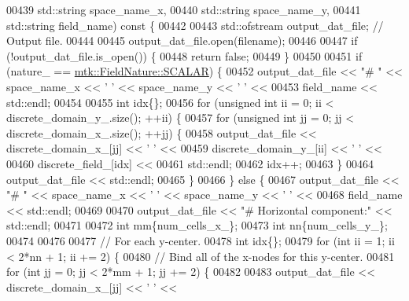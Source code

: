 \begin{DoxyCode}
00439                                     std::string space\_name\_x,
00440                                     std::string space\_name\_y,
00441                                     std::string field\_name)\textcolor{keyword}{ const }\{
00442 
00443   std::ofstream output\_dat\_file;  \textcolor{comment}{// Output file.}
00444 
00445   output\_dat\_file.open(filename);
00446 
00447   \textcolor{keywordflow}{if} (!output\_dat\_file.is\_open()) \{
00448     \textcolor{keywordflow}{return} \textcolor{keyword}{false};
00449   \}
00450 
00451   \textcolor{keywordflow}{if} (nature\_ == \hyperlink{namespacemtk_ga4c54f2a329cfb4e56213b02a259d19e2a8f3d9a4b6a7b7f2c7afa61ca113d0db9}{mtk::FieldNature::SCALAR}) \{
00452     output\_dat\_file << \textcolor{stringliteral}{"# "} << space\_name\_x <<  \textcolor{charliteral}{' '} << space\_name\_y << \textcolor{charliteral}{' '} <<
00453       field\_name << std::endl;
00454 
00455     \textcolor{keywordtype}{int} idx\{\};
00456     \textcolor{keywordflow}{for} (\textcolor{keywordtype}{unsigned} \textcolor{keywordtype}{int} ii = 0; ii < discrete\_domain\_y\_.size(); ++ii) \{
00457       \textcolor{keywordflow}{for} (\textcolor{keywordtype}{unsigned} \textcolor{keywordtype}{int} jj = 0; jj < discrete\_domain\_x\_.size(); ++jj) \{
00458         output\_dat\_file << discrete\_domain\_x\_[jj] << \textcolor{charliteral}{' '} <<
00459                            discrete\_domain\_y\_[ii] << \textcolor{charliteral}{' '} <<
00460                            discrete\_field\_[idx] <<
00461                           std::endl;
00462         idx++;
00463       \}
00464       output\_dat\_file << std::endl;
00465     \}
00466   \} \textcolor{keywordflow}{else} \{
00467     output\_dat\_file << \textcolor{stringliteral}{"# "} << space\_name\_x <<  \textcolor{charliteral}{' '} << space\_name\_y << \textcolor{charliteral}{' '} <<
00468       field\_name << std::endl;
00469 
00470     output\_dat\_file << \textcolor{stringliteral}{"# Horizontal component:"} << std::endl;
00471 
00472     \textcolor{keywordtype}{int} mm\{num\_cells\_x\_\};
00473     \textcolor{keywordtype}{int} nn\{num\_cells\_y\_\};
00474 
00476 
00477     \textcolor{comment}{// For each y-center.}
00478     \textcolor{keywordtype}{int} idx\{\};
00479     \textcolor{keywordflow}{for} (\textcolor{keywordtype}{int} ii = 1; ii < 2*nn + 1; ii += 2) \{
00480       \textcolor{comment}{// Bind all of the x-nodes for this y-center.}
00481       \textcolor{keywordflow}{for} (\textcolor{keywordtype}{int} jj = 0; jj < 2*mm + 1; jj += 2) \{
00482 
00483         output\_dat\_file << discrete\_domain\_x\_[jj] << \textcolor{charliteral}{' '} <<

\end{DoxyCode}
